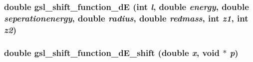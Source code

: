 \subsubsection{\setlength{\rightskip}{0pt plus 5cm}double gsl\_\-shift\_\-function\_\-d\-E (int {\em l}, double {\em energy}, double {\em seperationenergy}, double {\em radius}, double {\em redmass}, int {\em z1}, int {\em z2})}\label{GSL__ShftFunc__dE_8cpp_002442940a8252564422f24bd81e5bc9}


\subsubsection{\setlength{\rightskip}{0pt plus 5cm}double gsl\_\-shift\_\-function\_\-d\-E\_\-shift (double {\em x}, void $\ast$ {\em p})}\label{GSL__ShftFunc__dE_8cpp_2edcc276fab381272a2e0d24d976d480}


